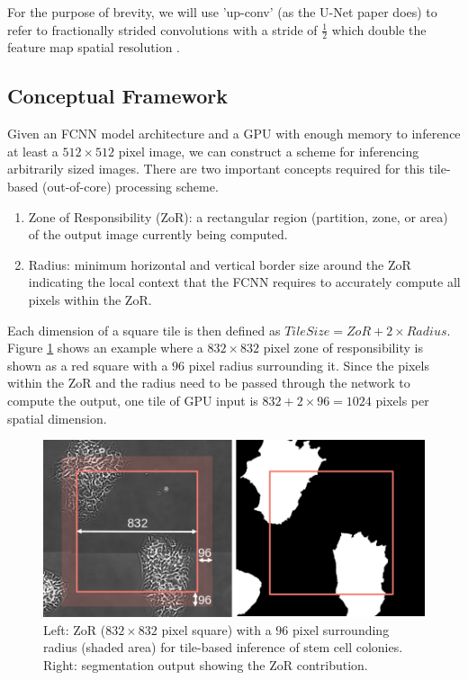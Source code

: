 \documentclass[letterpaper]{article} %
\begin{document}
For the purpose of brevity, we will use 'up-conv' (as the U-Net paper does) to refer to fractionally strided convolutions with a stride of $\frac{1}{2}$ which double the feature map spatial resolution \cite{Dumoulin2018}.

\subsection{Conceptual Framework}

Given an FCNN model architecture and a GPU with enough memory to inference at least a $512 \times 512$ pixel image, we can construct a scheme for inferencing arbitrarily sized images. There are two important concepts required for this tile-based (out-of-core) processing scheme. 
\begin{enumerate}
	\item Zone of Responsibility (ZoR): a rectangular region (partition, zone, or area) of the output image currently being computed.
	\item Radius: minimum horizontal and vertical border size around the ZoR indicating the local context that the FCNN requires to accurately compute all pixels within the ZoR.
\end{enumerate}

Each dimension of a square tile is then defined as $TileSize = ZoR + 2 \times Radius$. 
Figure \ref{fig:zor} shows an example where a $832 \times 832$ pixel zone of responsibility is shown as a red square with a $96$ pixel radius surrounding it. 
Since the pixels within the ZoR and the radius need to be passed through the network to compute the output, one tile of GPU input is $832 + 2 \times 96 = 1024$ pixels per spatial dimension.

\begin{figure}[h!]
	\centering
		\includegraphics[width=\linewidth]{figs/zor.png}
	\caption{Left: ZoR ($832 \times 832$ pixel square) with a $96$ pixel surrounding radius (shaded area) for tile-based inference of stem cell colonies. Right: segmentation output showing the ZoR contribution.}
	\label{fig:zor}
\end{figure}
\end{document}
